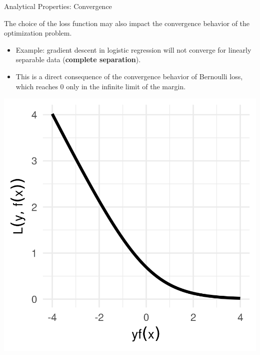 
\begin{vbframe}{Analytical Properties: Convergence}

\small
The choice of the loss function may also impact the convergence behavior of the 
optimization problem. 

\vspace{0.2cm}

\begin{minipage}[b]{0.7\textwidth}
  \begin{itemize} 
    \small
    \item Example: gradient descent in logistic regression will not converge for 
    linearly separable data (\textbf{complete separation}). 
    \item This is a direct consequence of the convergence behavior of Bernoulli 
    loss, which reaches 0 only in the infinite limit of the margin.
  \end{itemize}  
\end{minipage}%
\begin{minipage}[b]{0.05\textwidth}
  \phantom{foo}
\end{minipage}%
\begin{minipage}[b]{0.25\textwidth}
  \includegraphics[width=\textwidth]{figure/plot_bernoulli}
\end{minipage}%


\end{vbframe}
